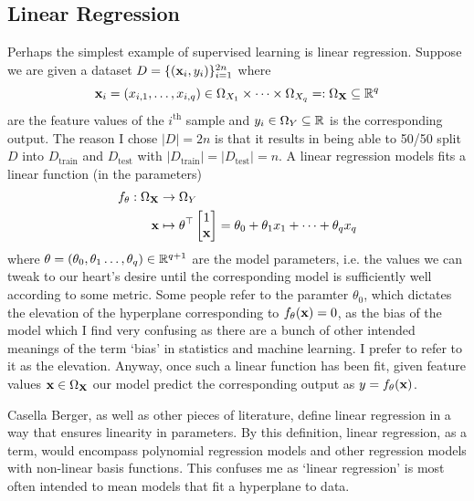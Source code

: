 \documentclass[11pt]{article}
\begin{document}
\subsection{Linear Regression}

Perhaps the simplest example of supervised learning is linear regression. Suppose we are given a dataset $D=\{(\mathbf{x}_i,y_i)\}_{i=1}^{2n}$ where
$$
\mathbf{x}_i=(x_{i,1},\dots,x_{i, q})\in \Omega_{X_1}\times\dots\times \Omega_{X_q}=:\Omega_{\mathbf{X}}\subseteq\mathbb{R}^q
$$
are the feature values of the $i^{\text{th}}$ sample and $y_i\in \Omega_{Y}\subseteq\mathbb{R}$ is the corresponding output. The reason I chose $|D|=2n$ is that it results in being able to 50/50 split $D$ into $D_{\text{train}}$ and $D_{\text{test}}$ with $|D_{\text{train}}|=|D_{\text{test}}|=n$. A linear regression models fits a linear function (in the parameters)
\begin{align*}
    f_{\theta}:\Omega_{\mathbf{X}}&\rightarrow \Omega_Y\\
    \mathbf{x}&\mapsto
    \theta^{\top}
    \begin{bmatrix}
        1\\
        \mathbf{x}
    \end{bmatrix}
    =
    \theta_0+\theta_1x_1+\dots+\theta_qx_q    
\end{align*}
where $\theta=(\theta_0,\theta_1\dots,\theta_q)\in\mathbb{R}^{q+1}$ are the model parameters, i.e. the values we can tweak to our heart's desire until the corresponding model is sufficiently well according to some metric. Some people refer to the paramter $\theta_0$, which dictates the elevation of the hyperplane corresponding to $f_{\theta}(\mathbf{x})=0$, as the bias of the model which I find very confusing as there are a bunch of other intended meanings of the term `bias' in statistics and machine learning. I prefer to refer to it as the elevation. Anyway, once such a linear function has been fit, given feature values $\mathbf{x}\in\Omega_{\mathbf{X}}$ our model predict the corresponding output as $y=f_{\theta}(\mathbf{x})$.

\begin{tcolorbox}[title={\centering\textbf{What does the `linear' in linear regression acrually refer to?}}, colback=myLightBlue, colbacktitle=myDarkBlue, colframe=myDarkBlue, coltitle=white]
    Casella Berger, as well as other pieces of literature, define linear regression in a way that ensures linearity in parameters. By this definition, linear regression, as a term, would encompass polynomial regression models and other regression models with non-linear basis functions. This confuses me as `linear regression' is most often intended to mean models that fit a hyperplane to data.
\end{tcolorbox}
\end{document}
